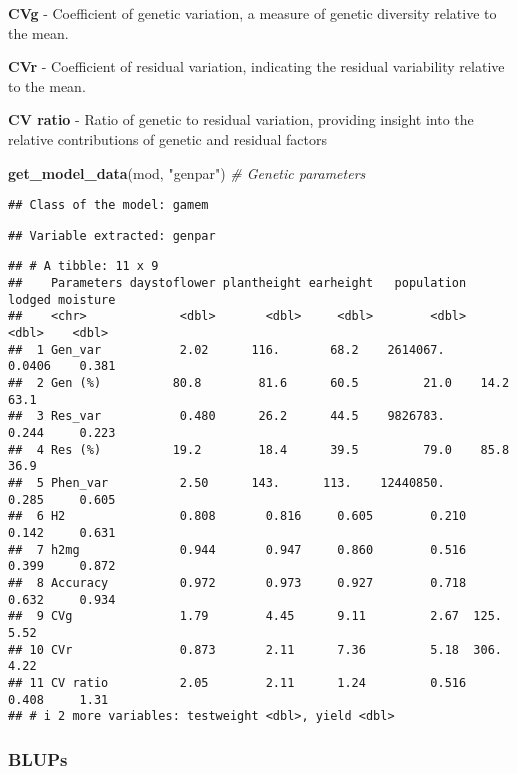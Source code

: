 \documentclass[
]{article}
\newenvironment{Shaded}{\begin{snugshade}}{\end{snugshade}}
\newcommand{\CommentTok}[1]{\textcolor[rgb]{0.56,0.35,0.01}{\textit{#1}}}
\newcommand{\FunctionTok}[1]{\textcolor[rgb]{0.13,0.29,0.53}{\textbf{#1}}}
\newcommand{\NormalTok}[1]{#1}
\newcommand{\StringTok}[1]{\textcolor[rgb]{0.31,0.60,0.02}{#1}}
\begin{document}
\textbf{CVg} - Coefficient of genetic variation, a measure of genetic
diversity relative to the mean.

\textbf{CVr} - Coefficient of residual variation, indicating the
residual variability relative to the mean.

\textbf{CV ratio} - Ratio of genetic to residual variation, providing
insight into the relative contributions of genetic and residual factors

\begin{Shaded}
\begin{Highlighting}[]
\FunctionTok{get\_model\_data}\NormalTok{(mod, }\StringTok{"genpar"}\NormalTok{) }\CommentTok{\# Genetic parameters}
\end{Highlighting}
\end{Shaded}

\begin{verbatim}
## Class of the model: gamem
\end{verbatim}

\begin{verbatim}
## Variable extracted: genpar
\end{verbatim}

\begin{verbatim}
## # A tibble: 11 x 9
##    Parameters daystoflower plantheight earheight   population   lodged moisture
##    <chr>             <dbl>       <dbl>     <dbl>        <dbl>    <dbl>    <dbl>
##  1 Gen_var           2.02      116.       68.2    2614067.      0.0406    0.381
##  2 Gen (%)          80.8        81.6      60.5         21.0    14.2      63.1  
##  3 Res_var           0.480      26.2      44.5    9826783.      0.244     0.223
##  4 Res (%)          19.2        18.4      39.5         79.0    85.8      36.9  
##  5 Phen_var          2.50      143.      113.    12440850.      0.285     0.605
##  6 H2                0.808       0.816     0.605        0.210   0.142     0.631
##  7 h2mg              0.944       0.947     0.860        0.516   0.399     0.872
##  8 Accuracy          0.972       0.973     0.927        0.718   0.632     0.934
##  9 CVg               1.79        4.45      9.11         2.67  125.        5.52 
## 10 CVr               0.873       2.11      7.36         5.18  306.        4.22 
## 11 CV ratio          2.05        2.11      1.24         0.516   0.408     1.31 
## # i 2 more variables: testweight <dbl>, yield <dbl>
\end{verbatim}

\subsubsection{BLUPs}\label{blups-1}
\end{document}
